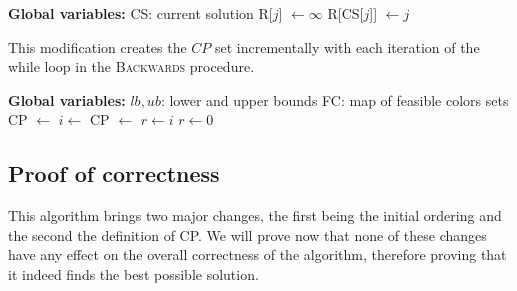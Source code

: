 \begin{alg}
	\label{alg:brelaz}
 \end{alg}
 
\begin{algorithmic}[1]
  \Statex \textbf{Global variables:}
 \Statex CS: current solution
            \ls R[$j$] $\gets  \infty$
        \mEndFor
                \ls R[CS[$j$]] $\gets j$
            \mEndIf
        \mEndFor
                \ls {}
            \mEndIf
        \mEndFor
	\mEndProcedure
\end{algorithmic}
\vspace{10pt} 
This modification creates the $CP$ set incrementally with each iteration of the while loop in the \textsc{Backwards} procedure.

\vspace{10pt} 
\begin{algorithmic}[1]
 \Statex \textbf{Global variables:}
 \Statex $lb, ub$: lower and upper bounds
 \Statex FC: map of feasible colors sets
        \ls CP $\gets$ 
            \ls $i \gets $ 
            \ls CP $\gets$ 
            \ls {}
                \ls $r \gets i$
                \ls \RETURN
            \mEndIf
        \mEndWhile
        \ls $r \gets 0$
	\mEndProcedure
\end{algorithmic}

\subsection{Proof of correctness}

This algorithm brings two major changes, the first being the initial ordering and the second the definition of CP. We will prove now that none of these changes have any effect on the overall correctness of the algorithm, therefore proving that it indeed finds the best possible solution.

